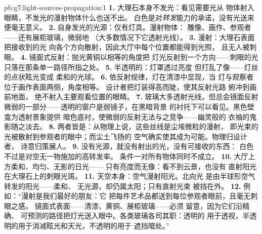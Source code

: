 \begin{solution}{pb:g7:light-sources-propagation:1}
\textbf{1.} 大理石本身不发光：看见需要光从
物体射入眼睛，不发光的漫射物体什么也送不出。
白色是对\emph{转发}能力的承诺，没有光送来
便毫无意义。
\textbf{2.} 自身发光的光源：仅有灯具。漫射物体：
雕像、画作、参观者——还有展柜玻璃，微弱地
（大多数情况下它透射光线）。
\textbf{3.} 漫射：大理石表面把接收到的光
向各个方向散射，因此大厅中每个位置都能得到光照，
且无人被刺眼。
\textbf{4.} 镜面式反射：抛光黄铜以相等的角度把
灯光反射到一个方向——刺眼的光
只落在那条单一路径所指之处。
\textbf{5.} 半透明的：灯罩透过亮度
但打乱了像——灯丝的点状眩光变成
柔和的光球。
\textbf{6.} 依反射规律，灯在清漆中显现，当
灯与观察者位于画作表面两侧，角度相等。
设计者把灯装得高而陡，使其反射光路
俯冲到画前地面，
绝不射入主要观看位置的眼睛。
\textbf{7.} 玻璃大多透射光线，但总会镜面反射
微弱的一部分——透明的窗户是弱镜子，在黑暗背景
的衬托下可以看见。黑色壁龛为透射景象提供
暗色底衬，使微弱的反射无法与之竞争——幽灵般的
衣袖的鬼影随之淡去。
\textbf{8.} 两者皆是：从物理上说，这些丝线是尘埃微粒的漫射，
即光束的光被散射到参观者的眼中；而尘土飞扬的
空气确实使其成为可能。物理归设计者，
诗意归策展人。
\textbf{9.} 没有光源，就没有射出的光，没有可接收的东西：
白色不过是对空无一物施加的高转发率。
条件一对所有物体同时不成立。
\textbf{10.} 大厅上方柔和、均匀、无影的日光——
只有亮度而无像：看不到云景，也没有
直射阳光在大理石上的刺眼光斑。
\textbf{11.} 天空本身：空气漫射阳光。北向光
是由半球形空气转发的阳光——柔和、
无光源，却仍属太阳；只有直射光束
被挡在外。
\textbf{12.} 例如：“漫射是我们最好的朋友：它
把每件艺术品都送到每位参观者眼前，且毫无刺眼之感。
镜面式表面——清漆、黄铜、展柜玻璃——必须
留意，因为它们沿精确、
可预测的路径把灯光送入眼中。各类玻璃各司其职：透明的
用于透视，半透明的用于消减眩光和天光，不透明的用于
遮挡暗处。”
\end{solution}
